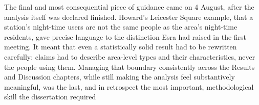 The final and most consequential piece of guidance came on 4 August, after the analysis itself was declared finished. Howard's Leicester Square example, that a station's night-time users are not the same people as the area's night-time residents, gave precise language to the distinction Esra had raised in the first meeting. It meant that even a statistically solid result had to be rewritten carefully: claims had to describe area-level types and their characteristics, never the people using them. Managing that boundary consistently across the Results and Discussion chapters, while still making the analysis feel substantively meaningful, was the last, and in retrospect the most important, methodological skill the dissertation required
